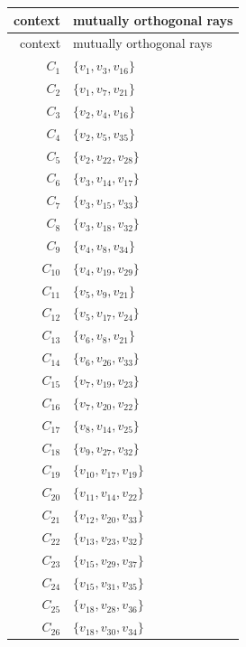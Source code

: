 \begin{longtable}{@{}r l@{}}
\toprule
context & mutually orthogonal rays\\
\midrule
\endfirsthead
\toprule
context & mutually orthogonal rays\\
\midrule
\endhead
$C_{1}$ & $\{v_{1},v_{3},v_{16}\}$\\
$C_{2}$ & $\{v_{1},v_{7},v_{21}\}$\\
$C_{3}$ & $\{v_{2},v_{4},v_{16}\}$\\
$C_{4}$ & $\{v_{2},v_{5},v_{35}\}$\\
$C_{5}$ & $\{v_{2},v_{22},v_{28}\}$\\
$C_{6}$ & $\{v_{3},v_{14},v_{17}\}$\\
$C_{7}$ & $\{v_{3},v_{15},v_{33}\}$\\
$C_{8}$ & $\{v_{3},v_{18},v_{32}\}$\\
$C_{9}$ & $\{v_{4},v_{8},v_{34}\}$\\
$C_{10}$ & $\{v_{4},v_{19},v_{29}\}$\\
$C_{11}$ & $\{v_{5},v_{9},v_{21}\}$\\
$C_{12}$ & $\{v_{5},v_{17},v_{24}\}$\\
$C_{13}$ & $\{v_{6},v_{8},v_{21}\}$\\
$C_{14}$ & $\{v_{6},v_{26},v_{33}\}$\\
$C_{15}$ & $\{v_{7},v_{19},v_{23}\}$\\
$C_{16}$ & $\{v_{7},v_{20},v_{22}\}$\\
$C_{17}$ & $\{v_{8},v_{14},v_{25}\}$\\
$C_{18}$ & $\{v_{9},v_{27},v_{32}\}$\\
$C_{19}$ & $\{v_{10},v_{17},v_{19}\}$\\
$C_{20}$ & $\{v_{11},v_{14},v_{22}\}$\\
$C_{21}$ & $\{v_{12},v_{20},v_{33}\}$\\
$C_{22}$ & $\{v_{13},v_{23},v_{32}\}$\\
$C_{23}$ & $\{v_{15},v_{29},v_{37}\}$\\
$C_{24}$ & $\{v_{15},v_{31},v_{35}\}$\\
$C_{25}$ & $\{v_{18},v_{28},v_{36}\}$\\
$C_{26}$ & $\{v_{18},v_{30},v_{34}\}$\\
\bottomrule
\end{longtable}
